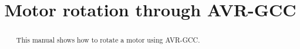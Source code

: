 \documentclass[journal,12pt,twocolumn]{IEEEtran}
\DeclareMathOperator*{\Res}{Res}
\begin{document}
\newtheorem{theorem}{Theorem}[section]
\newtheorem{problem}{Problem}
\newtheorem{proposition}{Proposition}[section]
\newtheorem{lemma}{Lemma}[section]
\newtheorem{corollary}[theorem]{Corollary}
\newtheorem{example}{Example}[section]
\newtheorem{definition}[problem]{Definition}

\newcommand{\BEQA}{\begin{eqnarray}}
\newcommand{\EEQA}{\end{eqnarray}}
\newcommand{\define}{\stackrel{\triangle}{=}}

\raggedbottom
\setlength{\parindent}{0pt}
\providecommand{\mbf}{\mathbf}
\providecommand{\pr}[1]{\ensuremath{\Pr\left(#1\right)}}
\providecommand{\qfunc}[1]{\ensuremath{Q\left(#1\right)}}
\providecommand{\sbrak}[1]{\ensuremath{{}\left[#1\right]}}
\providecommand{\lsbrak}[1]{\ensuremath{{}\left[#1\right.}}
\providecommand{\rsbrak}[1]{\ensuremath{{}\left.#1\right]}}
\providecommand{\brak}[1]{\ensuremath{\left(#1\right)}}
\providecommand{\lbrak}[1]{\ensuremath{\left(#1\right.}}
\providecommand{\rbrak}[1]{\ensuremath{\left.#1\right)}}
\providecommand{\cbrak}[1]{\ensuremath{\left\{#1\right\}}}
\providecommand{\lcbrak}[1]{\ensuremath{\left\{#1\right.}}
\providecommand{\rcbrak}[1]{\ensuremath{\left.#1\right\}}}
\theoremstyle{remark}
\newtheorem{rem}{Remark}
\newcommand{\sgn}{\mathop{\mathrm{sgn}}}
\providecommand{\abs}[1]{\left\vert#1\right\vert}
\providecommand{\res}[1]{\Res\displaylimits_{#1}} 
\providecommand{\norm}[1]{\left\lVert#1\right\rVert}
\providecommand{\mtx}[1]{\mathbf{#1}}
\providecommand{\mean}[1]{E\left[ #1 \right]}
\providecommand{\fourier}{\overset{\mathcal{F}}{ \rightleftharpoons}}
\providecommand{\system}{\overset{\mathcal{H}}{ \longleftrightarrow}}
\newcommand{\solution}{\noindent \textbf{Solution: }}
\newcommand{\cosec}{\,\text{cosec}\,}
\providecommand{\dec}[2]{\ensuremath{\overset{#1}{\underset{#2}{\gtrless}}}}
\newcommand{\myvec}[1]{\ensuremath{\begin{pmatrix}#1\end{pmatrix}}}
\newcommand{\mydet}[1]{\ensuremath{\begin{vmatrix}#1\end{vmatrix}}}
\makeatletter
{}
\makeatother
\let\StandardTheFigure\thefigure
\let\vec\mathbf
\renewcommand{\thefigure}{\theproblem}
\def\putbox#1#2#3{\makebox[0in][l]{\makeb
ox[#1][l]{}\raisebox{\baselineskip}[0in][0in]{\raisebox{#2}[0in][0in]{#3}}}}
     \def\rightbox#1{\makebox[0in][r]{#1}}
     \def\centbox#1{\makebox[0in]{#1}}
     \def\topbox#1{\raisebox{-\baselineskip}[0in][0in]{#1}}
     \def\midbox#1{\raisebox{-0.5\baselineskip}[0in][0in]{#1}}
\vspace{3cm}
\title{Motor rotation through  AVR-GCC}
\maketitle
\tableofcontents
\bigskip
\begin{abstract}
This manual shows how to rotate a motor using AVR-GCC.
\end{abstract}
\renewcommand{\thefigure}{\theenumi}
\renewcommand{\thetable}{\theenumi}
\end{document}
